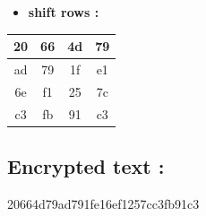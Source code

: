 \documentclass{article}
\begin{document}
\begin{itemize}
    \item \textbf{shift rows :}
\end{itemize} \begin{tabular}{|c|c|c|c|}
\hline 20 & 66 & 4d & 79 \\ \hline ad & 79 & 1f & e1 \\ \hline 6e & f1 & 25 & 7c \\ \hline c3 & fb & 91 & c3 \\ \hline \end{tabular}\hspace{0.5cm}\vspace{0.1cm}\subsection*{Encrypted text : } 20664d79ad791fe16ef1257cc3fb91c3
\end{document}
